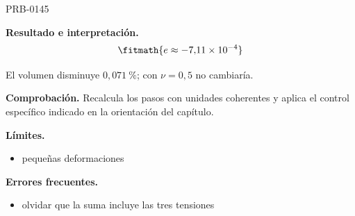 \begin{studiumworked}{PRB-0145}
\begin{enumerate}
\end{enumerate}

\textbf{Resultado e interpretación.}\[\fitmath{e \approx -7{,}11\times 10^{-4}}\]

El volumen disminuye $0{,}071\ \%$; con $\nu = 0{,}5$ no cambiaría.

\par\textbf{Comprobación.} Recalcula los pasos con unidades coherentes y aplica el control específico indicado en la orientación del capítulo.

\textbf{Límites.}\begin{itemize}\item pequeñas deformaciones\end{itemize}

\textbf{Errores frecuentes.}\begin{itemize}\item olvidar que la suma incluye las tres tensiones\end{itemize}

\end{studiumworked}

\Needspace{.3\textheight}

